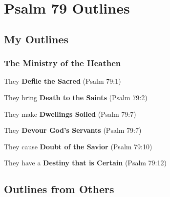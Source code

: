 \section{Psalm 79 Outlines}

\subsection{My Outlines}

\subsubsection{The Ministry of the Heathen}
 

\begin{compactenum}[I.]
    \item They \textbf{Defile the Sacred}  (Psalm 79:1)
    \item They bring \textbf{Death to the Saints}  (Psalm 79:2)
    \item They make \textbf{Dwellings Soiled} (Psalm 79:7)
    \item They \textbf{Devour God's Servants}  (Psalm 79:7)
    \item They cause \textbf{Doubt of the Savior}  (Psalm 79:10)
    \item They have a \textbf{Destiny that is Certain}  (Psalm 79:12)
\end{compactenum}


\subsection{Outlines from Others}

